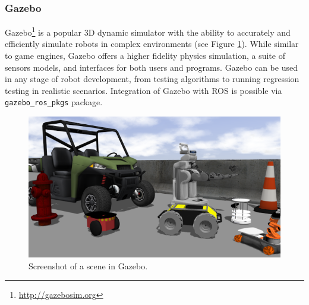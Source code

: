 \subsubsection{Gazebo} 
Gazebo\footnote{\url{http://gazebosim.org}} is a popular 3D dynamic simulator with the ability to accurately and efficiently simulate robots in complex environments (see Figure \ref{gazebo_screenshot}). While similar to game engines, Gazebo offers a higher fidelity physics simulation, a suite of sensors models, and interfaces for both users and programs. Gazebo can be used in any stage of robot development, from testing algorithms to running regression testing in realistic scenarios.
Integration of Gazebo with ROS is possible via \texttt{gazebo\_ros\_pkgs} package. 
 
\begin{figure}[ht] 
    \centering 
    \includegraphics[width=0.9\linewidth]{tex/figs/ch02_figs/Gazebo.PNG}
    \caption{Screenshot of a scene in Gazebo.}
    \label{gazebo_screenshot} 
\end{figure} 
